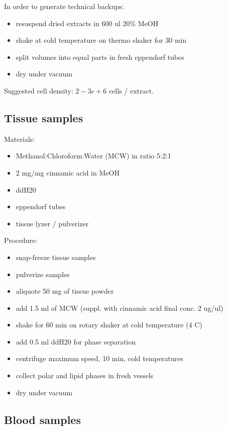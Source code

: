 \documentclass[]{book}
\providecommand{\tightlist}{%
  \setlength{\itemsep}{0pt}\setlength{\parskip}{0pt}}
\begin{document}
In order to generate technical backups:

\begin{itemize}
\tightlist
\item
  resuspend dried extracts in 600 ul 20\% MeOH
\item
  shake at cold temperature on thermo shaker for 30 min
\item
  split volumes into equal parts in fresh eppendorf tubes
\item
  dry under vacuum
\end{itemize}

Suggested cell density: \(2-3e+6\) cells / extract.

\hypertarget{tissue-samples}{%
\subsection{Tissue samples}\label{tissue-samples}}

Materials:

\begin{itemize}
\tightlist
\item
  Methanol:Chloroform:Water (MCW) in ratio 5:2:1
\item
  2 mg/mg cinnamic acid in MeOH
\item
  ddH20
\item
  eppendorf tubes
\item
  tissue lyzer / pulverizer
\end{itemize}

Procedure:

\begin{itemize}
\tightlist
\item
  snap-freeze tissue samples
\item
  pulverize samples
\item
  aliquote 50 mg of tissue powder
\item
  add 1.5 ml of MCW (suppl. with cinnamic acid final conc. 2 ug/ul)
\item
  shake for 60 min on rotary shaker at cold temperature (4 C)
\item
  add 0.5 ml ddH20 for phase separation
\item
  centrifuge maximum speed, 10 min, cold temperatures
\item
  collect polar and lipid phases in fresh vessels
\item
  dry under vacuum
\end{itemize}

\hypertarget{blood-samples}{%
\subsection{Blood samples}\label{blood-samples}}
\end{document}
